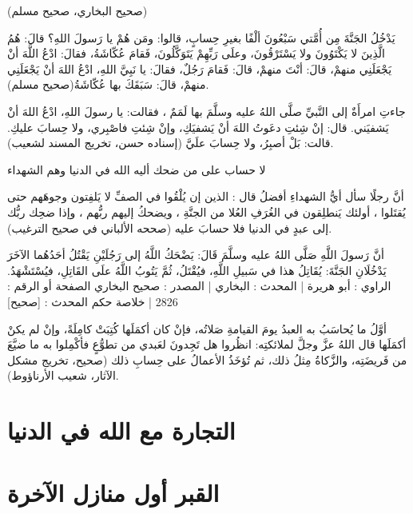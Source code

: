 {\footnotesize (صحيح البخاري، صحيح مسلم)}

يَدْخُلُ الجَنَّةَ مِن أُمَّتي سَبْعُونَ ألْفًا بغيرِ حِسابٍ، قالوا: ومَن هُمْ يا رَسولَ اللهِ؟ قالَ: هُمُ الَّذِينَ لا يَكْتَوُونَ ولا يَسْتَرْقُونَ، وعلَى رَبِّهِمْ يَتَوَكَّلُونَ، فَقامَ عُكّاشَةُ، فقالَ: ادْعُ اللَّهَ أنْ يَجْعَلَنِي منهمْ، قالَ: أنْتَ منهمْ، قالَ: فَقامَ رَجُلٌ، فقالَ: يا نَبِيَّ اللهِ، ادْعُ اللهَ أنْ يَجْعَلَنِي منهمْ، قالَ: سَبَقَكَ بها عُكّاشَةُ{\footnotesize (صحيح مسلم)}.


جاءتِ امرأَةٌ إلى النَّبيِّ صلَّى اللهُ عليه وسلَّمَ بها لَمَمٌ ، فقالت: يا رسولَ اللهِ، ادْعُ اللهَ أنْ يَشفيَني. قال: إنْ شِئتِ دعَوتُ اللهَ أنْ يَشفيَكِ، وإنْ شِئتِ فاصْبِري، ولا حِسابَ عليكِ. قالت: بَلْ أصبِرُ، ولا حِسابَ علَيَّ {\footnotesize (إسناده حسن، تخريج المسند لشعيب)}.


لا حساب على من ضحك أليه الله في الدنيا وهم الشهداء

أنَّ رجلًا سأل أيُّ الشهداءِ أفضلُ قال : الذين إن يُلْقُوا في الصفِّ لا يَلفِتون وجوهَهم حتى يُقتَلوا ، أولئك يَنطلِقون في الغُرَفِ العُلا من الجنَّةِ ، ويضحكُ إليهم ربُّهم ، وإذا ضحِك ربُّك إلى عبدٍ في الدنيا فلا حسابَ عليه 
{\footnotesize (صححه الألباني في صحيح الترغيب)}.

أنَّ رَسولَ اللَّهِ صَلَّى اللهُ عليه وسلَّمَ قَالَ: يَضْحَكُ اللَّهُ إلى رَجُلَيْنِ يَقْتُلُ أحَدُهُما الآخَرَ يَدْخُلَانِ الجَنَّةَ: يُقَاتِلُ هذا في سَبيلِ اللَّهِ، فيُقْتَلُ، ثُمَّ يَتُوبُ اللَّهُ علَى القَاتِلِ، فيُسْتَشْهَدُ.
الراوي : أبو هريرة | المحدث : البخاري | المصدر : صحيح البخاري
الصفحة أو الرقم : 2826 | خلاصة حكم المحدث : [صحيح] 


أوَّلُ ما يُحاسَبُ به العبدُ يومَ القيامةِ صَلاتُه، فإنْ كان أكمَلَها كُتِبَتْ كامِلَةً، وإنْ لم يكنْ أكمَلَها قال اللهُ عزَّ وجلَّ لملائكتِه: انظُروا هل تَجِدونَ لعَبدي من تطوُّعٍ فأكْمِلوا به ما ضيَّعَ من فَريضَتِه، والزَّكاةُ مِثلُ ذلك، ثم تُؤخَذُ الأعمالُ على حِسابِ ذلك {\footnotesize (صحيح، تخريج مشكل الآثار، شعيب الأرناؤوط)}.

\section{التجارة مع الله في الدنيا}

\section{القبر أول منازل الآخرة}

